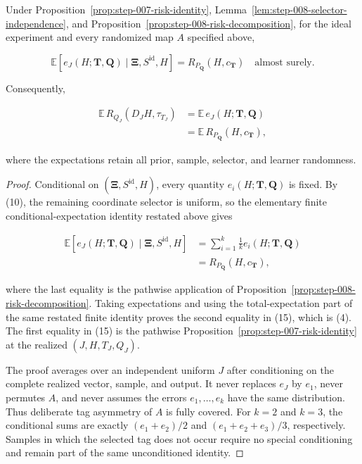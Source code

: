 \begin{proposition}\label{prop:step-008-selected-risk-identity}
Under Proposition~\ref{prop:step-007-risk-identity},
Lemma~\ref{lem:step-008-selector-independence}, and
Proposition~\ref{prop:step-008-risk-decomposition}, for the ideal experiment
and every randomized map \(A\) specified above,

\[
\mathbb E\!\left[
e_J(H;\boldsymbol T,\boldsymbol Q)
\mid\boldsymbol\Xi,S^{\mathrm{id}},H
\right]
=R_{P_{\boldsymbol Q}}(H,c_{\boldsymbol T})
\quad\text{almost surely}.
\tag{14}
\]

Consequently,

\[
\begin{aligned}
\mathbb E\,
R_{Q_J}(D_JH,\tau_{T_J})
&=\mathbb E\,e_J(H;\boldsymbol T,\boldsymbol Q)\\
&=\mathbb E\,R_{P_{\boldsymbol Q}}(H,c_{\boldsymbol T}),
\end{aligned}
\tag{15}
\]

where the expectations retain all prior, sample, selector, and learner
randomness.
\end{proposition}

\begin{proof}
Conditional on \((\boldsymbol\Xi,S^{\mathrm{id}},H)\), every quantity
\(e_i(H;\boldsymbol T,\boldsymbol Q)\) is fixed. By (10), the remaining
coordinate selector is uniform, so the elementary finite
conditional-expectation identity restated above gives

\[
\begin{aligned}
\mathbb E\!\left[
e_J(H;\boldsymbol T,\boldsymbol Q)
\mid\boldsymbol\Xi,S^{\mathrm{id}},H
\right]
&=\sum_{i=1}^k\frac1k
  e_i(H;\boldsymbol T,\boldsymbol Q)\\
&=R_{P_{\boldsymbol Q}}(H,c_{\boldsymbol T}),
\end{aligned}
\]

where the last equality is the pathwise application of
Proposition~\ref{prop:step-008-risk-decomposition}. Taking expectations and
using the total-expectation part of the same restated finite identity proves
the second equality in (15), which is (4). The first equality in (15) is the
pathwise Proposition~\ref{prop:step-007-risk-identity} at the realized
\((J,H,T_J,Q_J)\).

The proof averages over an independent uniform \(J\) after conditioning on
the complete realized vector, sample, and output. It never replaces
\(e_J\) by \(e_1\), never permutes \(A\), and never assumes the errors
\(e_1,\ldots,e_k\) have the same distribution. Thus deliberate tag
asymmetry of \(A\) is fully covered. For \(k=2\) and \(k=3\), the
conditional sums are exactly \((e_1+e_2)/2\) and
\((e_1+e_2+e_3)/3\), respectively. Samples in which the selected tag does
not occur require no special conditioning and remain part of the same
unconditioned identity. \end{proof}
